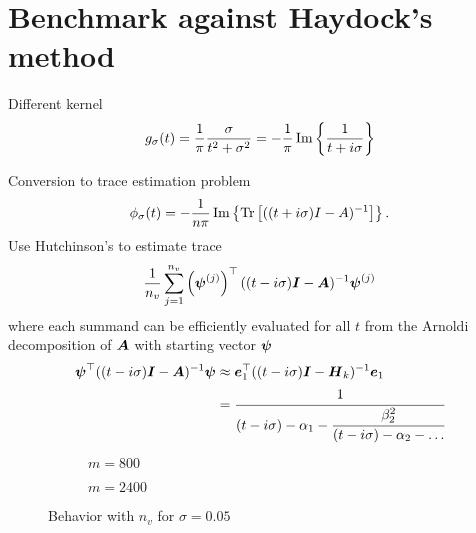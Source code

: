 \section{Benchmark against Haydock's method}
\label{sec:5-experiments-haydock-method}

Different kernel
\begin{equation}
    g_{\sigma}(t) = \frac{1}{\pi} \frac{\sigma}{t^2 + \sigma^2} = -\frac{1}{\pi} \operatorname{Im}\left\{ \frac{1}{t + i\sigma} \right\}
    \label{equ:5-experiments-cauchy-kernel}
\end{equation}

Conversion to trace estimation problem
\begin{equation}
    \phi_{\sigma}(t) = - \frac{1}{n \pi} \operatorname{Im} \left\{ \operatorname{Tr}\left[((t + i\sigma)I - A)^{-1}\right]  \right\}.
    \label{equ:5-experiments-haydock-trace}
\end{equation}
Use Hutchinson's to estimate trace
\begin{equation}
    \frac{1}{n_v} \sum_{j=1}^{n_v} \left( \boldsymbol{\psi}^{(j)} \right)^{\top} ((t - i\sigma)\boldsymbol{I} - \boldsymbol{A})^{-1} \boldsymbol{\psi}^{(j)}
    \label{equ:5-experiments-haydock-hutchinson}
\end{equation}
where each summand can be efficiently evaluated for all $t$ from the Arnoldi decomposition of $\boldsymbol{A}$ with starting vector $\boldsymbol{\psi}$
\begin{align}
    \boldsymbol{\psi}^{\top} ((t - i\sigma)\boldsymbol{I} - \boldsymbol{A})^{-1} \boldsymbol{\psi} &\approx \boldsymbol{e}_1^{\top} ((t - i\sigma)\boldsymbol{I} - \boldsymbol{H}_k)^{-1} \boldsymbol{e}_1 \notag \\
    &= \cfrac{1}{(t - i\sigma) - \alpha_1 - \cfrac{\beta_2^2}{(t - i\sigma) - \alpha_2 - \dots}}
    \label{equ:5-experiments-haydock-recursion}
\end{align}

\clearpage
\begin{figure}[ht]
    \begin{subfigure}[b]{0.45\columnwidth}
        
        \caption{$m=800$}
        \label{fig:5-experiments-haydock-convergence-nv-m800}
    \end{subfigure}
    \begin{subfigure}[b]{0.5\columnwidth}
        
        \caption{$m=2400$}
        \label{fig:5-experiments-haydock-convergence-nv-m2400}
    \end{subfigure}
    \caption{Behavior with $n_v$ for $\sigma=0.05$}
    \label{fig:5-experiments-haydock-convergence-nv}
\end{figure}


